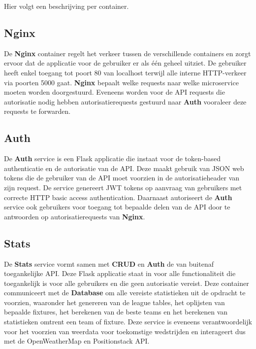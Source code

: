 \documentclass[10pt]{article}
\begin{document}
\noindent Hier volgt een beschrijving per container.

\subsection{Nginx}
De \textbf{Nginx} container regelt het verkeer tussen de verschillende containers en zorgt ervoor dat de applicatie voor de gebruiker er als één geheel uitziet. De gebruiker heeft enkel toegang tot poort 80 van localhost terwijl alle interne HTTP-verkeer via poorten 5000 gaat. \textbf{Nginx} bepaalt welke requests naar welke microservice moeten worden doorgestuurd. Eveneens worden voor de API requests die autorisatie nodig hebben autorisatierequests gestuurd naar \textbf{Auth} vooraleer deze requests te forwarden.

\subsection{Auth}
De \textbf{Auth} service is een Flask applicatie die instaat voor de token-based authenticatie en de autorisatie van de API. Deze maakt gebruik van JSON web tokens die de gebruiker van de API moet voorzien in de autorisatieheader van zijn request. De service genereert JWT tokens op aanvraag van gebruikers met correcte HTTP basic access authentication.
Daarnaast autoriseert de \textbf{Auth} service ook gebruikers voor toegang tot bepaalde delen van de API door te antwoorden op autorisatierequests van \textbf{Nginx}.

\subsection{Stats}
De \textbf{Stats} service vormt samen met \textbf{CRUD} en \textbf{Auth} de van buitenaf toegankelijke API. Deze Flask applicatie staat in voor alle functionaliteit die toegankelijk is voor alle gebruikers en die geen autorisatie vereist. Deze container communiceert met de \textbf{Database} om alle vereiste statistieken uit de opdracht te voorzien, waaronder het genereren van de league tables, het oplijsten van bepaalde fixtures, het berekenen van de beste teams en het berekenen van statistieken omtrent een team of fixture. Deze service is eveneens verantwoordelijk voor het voorzien van weerdata voor toekomstige wedstrijden en interageert dus met de OpenWeatherMap en Positionstack API.
\end{document}
